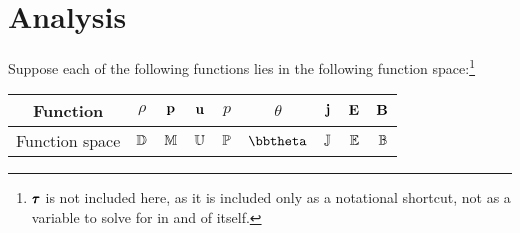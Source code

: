 \section{Analysis}

    Suppose each of the following functions lies in the following function space:\footnote{$\pmb{\mathsf{\tau}}$ is not included here, as it is included only as a notational shortcut, not as a variable to solve for in and of itself.} 
    \begin{center}\begin{tabular}{ c || c : c c : c c | c | c c }
        Function  &  $\rho$  &  $\mathbf{p}$  &  $\mathbf{u}$  &  $p$  &  $\theta$ 
         &  $\mathbf{j}$  &  $\mathbf{E}$  &  $\mathbf{B}$  \\
        \hline
        Function space  &  $\mathbb{D}$  &  $\mathbb{M}$  &  $\mathbb{U}$  &  $\mathbb{P}$  &  $\bbtheta$  &  $\mathbb{J}$  &  $\mathbb{E}$  &  $\mathbb{B}$  \\
    \end{tabular}\end{center}


    
    
